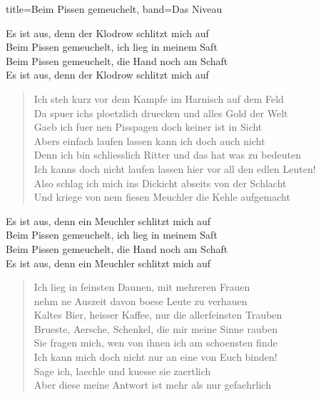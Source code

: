 \begin{song}{title=Beim Pissen gemeuchelt, band=Das Niveau}
        \begin{chorus}
            Es ist aus, denn der Klodrow schlitzt mich auf \\
            Beim Pissen gemeuchelt, ich lieg in meinem Saft \\
            Beim Pissen gemeuchelt, die Hand noch am Schaft \\
            Es ist aus, denn der Klodrow schlitzt mich auf \\
        \end{chorus}

        \begin{verse}
            Ich steh kurz vor dem Kampfe im Harnisch auf dem Feld \\
            Da spuer ichs ploetzlich druecken und alles Gold der Welt \\
            Gaeb ich fuer nen Pisspagen doch keiner ist in Sicht \\
            Abers einfach laufen lassen kann ich doch auch nicht \\
            Denn ich bin schliesslich Ritter und das hat was zu bedeuten \\
            Ich kanns doch nicht laufen lassen hier vor all den edlen Leuten! \\
            Also schlag ich mich ins Dickicht abseits von der Schlacht \\
            Und kriege von nem fiesen Meuchler die Kehle aufgemacht \\
        \end{verse}

        \begin{chorus}
            Es ist aus, denn ein Meuchler schlitzt mich auf \\
            Beim Pissen gemeuchelt, ich lieg in meinem Saft \\
            Beim Pissen gemeuchelt, die Hand noch am Schaft \\
            Es ist aus, denn ein Meuchler schlitzt mich auf \\
        \end{chorus}

        \begin{verse}
            Ich lieg in feinsten Daunen, mit mehreren Frauen \\
            nehm ne Auszeit davon boese Leute zu verhauen \\
            Kaltes Bier, heisser Kaffee, nur die allerfeinsten Trauben \\
            Brueste, Aersche, Schenkel, die mir meine Sinne rauben \\
            Sie fragen mich, wen von ihnen ich am schoensten finde \\
            Ich kann mich doch nicht nur an eine von Euch binden! \\
            Sage ich, laechle und kuesse sie zaertlich \\
            Aber diese meine Antwort ist mehr als nur gefaehrlich \\
        \end{verse}


\end{song}
